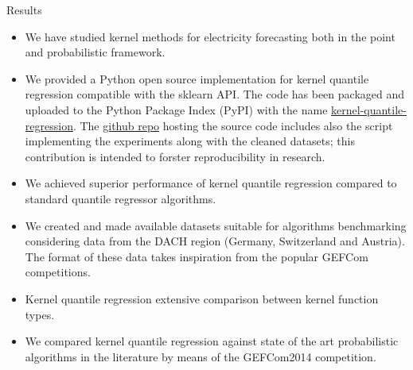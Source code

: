 

\begin{frame}{Results}
    \begin{itemize}
        \item We have studied kernel methods for electricity forecasting both in the point and probabilistic framework.
        \item We provided a Python open source implementation for kernel quantile regression compatible with the sklearn API. The code has been packaged and uploaded to the Python Package Index (PyPI) with the name \href{https://pypi.org/project/kernel-quantile-regression/\#2}{kernel-quantile-regression}. The \href{https://github.com/luca-pernigo/kernel_quantile_regression}{github repo} hosting the source code includes also the script implementing the experiments along with the cleaned datasets; this contribution is intended to forster reproducibility in research.
        \item We achieved superior performance of kernel quantile regression compared to standard quantile regressor algorithms. 
        \item We created and made available datasets suitable for algorithms benchmarking considering data from the DACH region (Germany, Switzerland and Austria). The format of these data takes inspiration from the popular GEFCom competitions.
        \item Kernel quantile regression extensive comparison between kernel function types.
        \item We compared kernel quantile regression against state of the art probabilistic algorithms in the literature by means of the GEFCom2014 competition.
    \end{itemize}
\end{frame}